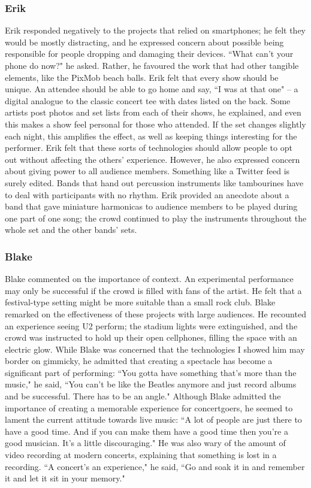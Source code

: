 \subsubsection{Erik}
Erik responded negatively to the projects that relied on smartphones; he felt they would be mostly distracting, and he expressed concern about possible being responsible for people dropping and damaging their devices. ``What can't your phone do now?" he asked. Rather, he favoured the work that had other tangible elements, like the PixMob beach balls. Erik felt that every show should be unique. An attendee should be able to go home and say, ``I was at that one" -- a digital analogue to the classic concert tee with dates listed on the back. Some artists post photos and set lists from each of their shows, he explained, and even this makes a show feel personal for those who attended. If the set changes slightly each night, this amplifies the effect, as well as keeping things interesting for the performer. Erik felt that these sorts of technologies should allow people to opt out without affecting the others' experience. However, he also expressed concern about giving power to all audience members. Something like a Twitter feed is surely edited. Bands that hand out percussion instruments like tambourines have to deal with participants with no rhythm. Erik provided an anecdote about a band that gave miniature harmonicas to audience members to be played during one part of one song; the crowd continued to play the instruments throughout the whole set and the other bands' sets.

\subsubsection{Blake}
Blake commented on the importance of context. An experimental performance may only be successful if the crowd is filled with fans of the artist. He felt that a festival-type setting might be more suitable than a small rock club. Blake remarked on the effectiveness of these projects with large audiences. He recounted an experience seeing U2 perform; the stadium lights were extinguished, and the crowd was instructed to hold up their open cellphones, filling the space with an electric glow. While Blake was concerned that the technologies I showed him may border on gimmicky, he admitted that creating a spectacle has become a significant part of performing: ``You gotta have something that's more than the music," he said, ``You can't be like the Beatles anymore and just record albums and be successful. There has to be an angle." Although Blake admitted the importance of creating a memorable experience for concertgoers, he seemed to lament the current attitude towards live music: ``A lot of people are just there to have a good time. And if you can make them have a good time then you're a good musician. It's a little discouraging." He was also wary of the amount of video recording at modern concerts, explaining that something is lost in a recording. ``A concert's an experience," he said, ``Go and soak it in and remember it and let it sit in your memory."

